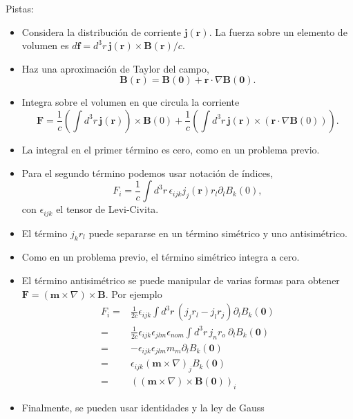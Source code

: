 \documentclass{exam}
\begin{document}
\begin{questions}

  Pistas:
  \begin{itemize}
  \item Considera la distribución de corriente $\bm j(\bm r)$. La
    fuerza sobre un elemento de volumen es $d\bm f=d^3r\,\bm j(\bm
    r)\times\bm B(\bm r)/c$.
  \item Haz una aproximación de Taylor del campo,
    $$
    \bm B(\bm r)=\bm B(\bm 0)+\bm r\cdot\nabla\bm B(\bm 0).
    $$
  \item Integra sobre el volumen en que circula la corriente
    $$
    \bm F=\frac{1}{c}\left(\int d^3r\, \bm j(\bm r)\right)\times \bm
    B(0)
    + \frac{1}{c}\left(\int d^3r\, \bm j(\bm r) \times (\bm
      r\cdot\nabla\bm B(0))\right).
    $$
  \item La integral en el primer término es cero, como en un problema
    previo.
  \item Para el segundo término podemos usar notación de índices,
    $$
    F_i=\frac{1}{c}\int d^3r\, \epsilon_{ijk} j_j(\bm r)r_l\partial_l
    B_k(0),
    $$
    con $\epsilon_{ijk}$ el tensor de Levi-Civita.
  \item El término $j_k r_l$ puede separarse en un término simétrico y
    uno antisimétrico.
  \item Como en un problema previo, el término simétrico integra a
    cero.
  \item El término antisimétrico se puede manipular de varias formas
    para obtener $\bm F=(\bm m\times\nabla)\times \bm B$. Por ejemplo
    \begin{eqnarray*}
      F_i=&\frac{1}{2c}\epsilon_{ijk}\int d^3r\,
            (j_jr_l-j_lr_j)\partial_l B_k(\bm 0)\\
      =&\frac{1}{2c}\epsilon_{ijk}\epsilon_{jlm}\epsilon_{nom}\int d^3r\,
         j_nr_o\
         \partial_l B_k(\bm 0)\\
      =&-\epsilon_{ijk}\epsilon_{jlm}m_m \partial_l B_k(\bm 0)\\
      =&\epsilon_{ijk} (\bm m \times \nabla)_j B_k(\bm 0)\\
      =&\left((\bm m \times \nabla) \times \bm B(\bm 0)\right)_i
    \end{eqnarray*}
  \item Finalmente, se pueden usar identidades y la ley de Gauss

\end{itemize}
\end{questions}
\end{document}

